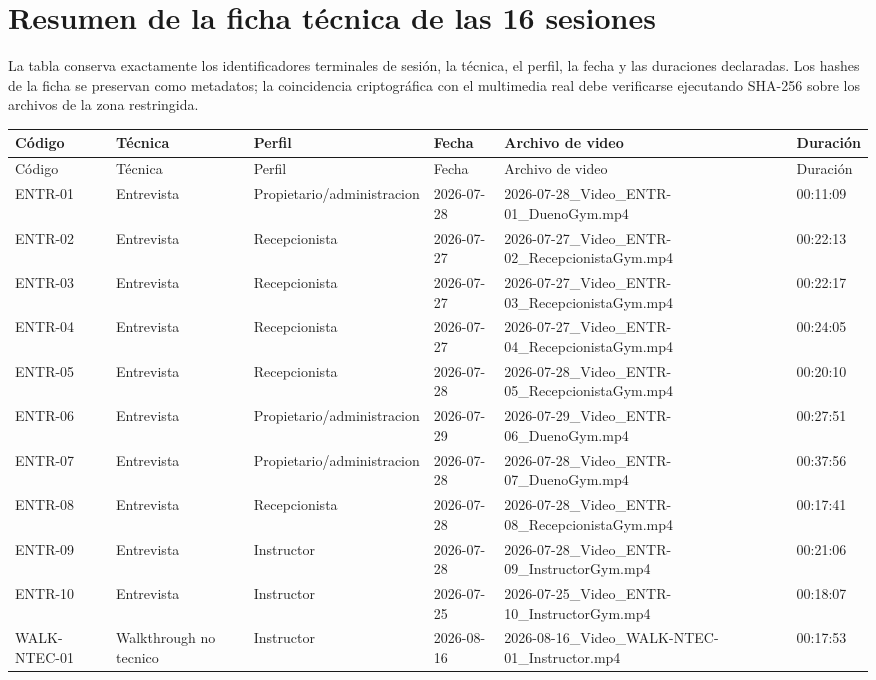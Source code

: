 \documentclass[11pt,a4paper,twoside]{article}
\begin{document}
\appendix
\section{Resumen de la ficha técnica de las 16 sesiones}
La tabla conserva exactamente los identificadores terminales de sesión, la técnica, el perfil, la fecha y las duraciones declaradas. Los hashes de la ficha se preservan como metadatos; la coincidencia criptográfica con el multimedia real debe verificarse ejecutando SHA-256 sobre los archivos de la zona restringida.
\begin{landscape}
\scriptsize
\begin{longtable}{p{2.2cm}p{3.2cm}p{4.2cm}p{2.7cm}p{7.8cm}p{2.2cm}}
\toprule Código & Técnica & Perfil & Fecha & Archivo de video & Duración \\ \midrule\endfirsthead
\toprule Código & Técnica & Perfil & Fecha & Archivo de video & Duración \\ \midrule\endhead
ENTR-01 & Entrevista & Propietario/administracion & 2026-07-28 & 2026-07-28\_Video\_ENTR-01\_DuenoGym.mp4 & 00:11:09 \\
ENTR-02 & Entrevista & Recepcionista & 2026-07-27 & 2026-07-27\_Video\_ENTR-02\_RecepcionistaGym.mp4 & 00:22:13 \\
ENTR-03 & Entrevista & Recepcionista & 2026-07-27 & 2026-07-27\_Video\_ENTR-03\_RecepcionistaGym.mp4 & 00:22:17 \\
ENTR-04 & Entrevista & Recepcionista & 2026-07-27 & 2026-07-27\_Video\_ENTR-04\_RecepcionistaGym.mp4 & 00:24:05 \\
ENTR-05 & Entrevista & Recepcionista & 2026-07-28 & 2026-07-28\_Video\_ENTR-05\_RecepcionistaGym.mp4 & 00:20:10 \\
ENTR-06 & Entrevista & Propietario/administracion & 2026-07-29 & 2026-07-29\_Video\_ENTR-06\_DuenoGym.mp4 & 00:27:51 \\
ENTR-07 & Entrevista & Propietario/administracion & 2026-07-28 & 2026-07-28\_Video\_ENTR-07\_DuenoGym.mp4 & 00:37:56 \\
ENTR-08 & Entrevista & Recepcionista & 2026-07-28 & 2026-07-28\_Video\_ENTR-08\_RecepcionistaGym.mp4 & 00:17:41 \\
ENTR-09 & Entrevista & Instructor & 2026-07-28 & 2026-07-28\_Video\_ENTR-09\_InstructorGym.mp4 & 00:21:06 \\
ENTR-10 & Entrevista & Instructor & 2026-07-25 & 2026-07-25\_Video\_ENTR-10\_InstructorGym.mp4 & 00:18:07 \\
WALK-NTEC-01 & Walkthrough no tecnico & Instructor & 2026-08-16 & 2026-08-16\_Video\_WALK-NTEC-01\_Instructor.mp4 & 00:17:53 \\

\end{longtable}
\end{landscape}
\end{document}
